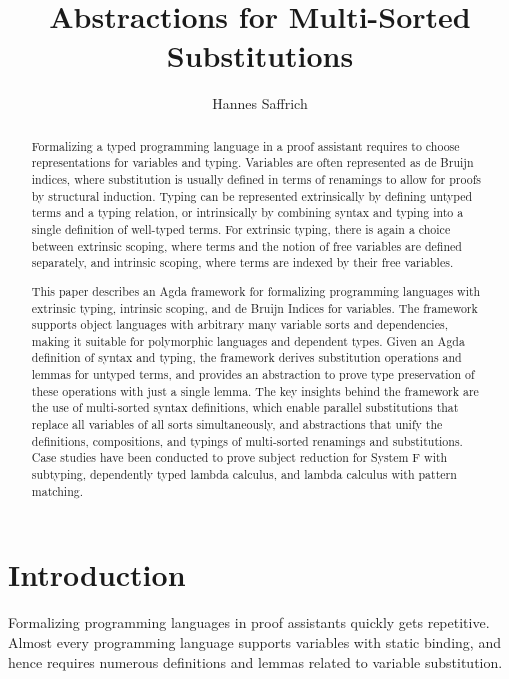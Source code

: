 \documentclass[sigplan,10pt, anonymous]{acmart}
\title{Abstractions for Multi-Sorted Substitutions}
\author{Hannes Saffrich}
\affiliation{
  \institution{University of Freiburg}      %
  \country{Germany}                         %
}
\begin{document}
  \begin{abstract}
    Formalizing a typed programming language in a proof assistant
    requires to choose representations for variables and typing.
    Variables are often represented as de Bruijn indices, where
    substitution is usually defined in terms of renamings to allow for
    proofs by structural induction.
    Typing can be represented extrinsically by defining untyped terms and a typing
    relation, or intrinsically by combining syntax and typing into a single
    definition of well-typed terms.
    For extrinsic typing, there is again a choice between extrinsic
    scoping, where terms and the notion of free variables are defined
    separately, and intrinsic scoping, where terms are indexed by their
    free variables.

    This paper describes an Agda framework for formalizing programming
    languages with extrinsic typing, intrinsic scoping, and de Bruijn
    Indices for variables.
    The framework supports object languages with arbitrary many
    variable sorts and dependencies, making it suitable for
    polymorphic languages and dependent types.
    Given an Agda definition of syntax and typing, the framework derives
    substitution operations and lemmas for untyped terms, and provides an
    abstraction to prove type preservation of these operations with
    just a single lemma.
    The key insights behind the framework are the use of multi-sorted syntax
    definitions, which enable parallel substitutions that replace
    all variables of all sorts simultaneously, and
    abstractions that unify the definitions, compositions, and typings
    of multi-sorted renamings and substitutions.
    Case studies have been conducted to prove subject reduction for
    System F with subtyping, dependently typed lambda calculus, and lambda
    calculus with pattern matching.
  \end{abstract}

  \maketitle

  \section{Introduction}
  \label{sec:introduction}

  Formalizing programming languages in proof assistants quickly gets
  repetitive. Almost every programming language supports variables
  with static binding, and hence requires numerous definitions and
  lemmas related to variable substitution.
\end{document}
